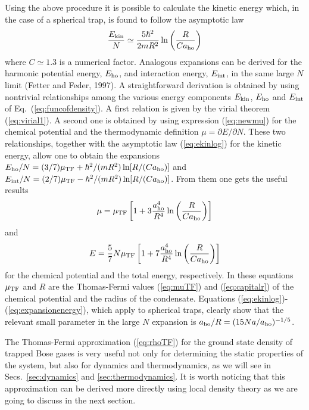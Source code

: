 Using the above procedure it is possible to calculate the kinetic energy  
which, in the case of a spherical trap, is found to follow the 
asymptotic law 
\begin{equation}
{ E_{\rm kin} \over N } \simeq { 5 \hbar^2 \over 2mR^2 } 
\ln \left( { R  \over C a_{\rm ho} } \right)
\label{eq:ekinlog}
\end{equation}
where $C\simeq 1.3$ is a numerical factor.
Analogous expansions can be derived for the harmonic potential energy,
$E_{\rm ho}$,  and interaction energy, $E_{\rm int}$, in the same large $N$
limit (Fetter and Feder, 1997). A straightforward derivation is obtained 
by using nontrivial relationships among the various energy components 
$E_{\rm kin}$, $E_{\rm ho}$ 
and $E_{\rm int}$ of Eq.~(\ref{eq:funcofdensity}).  A first relation is 
given by the virial theorem (\ref{eq:virial1}). A second one is obtained 
by using expression (\ref{eq:newmu}) for the chemical potential and the 
thermodynamic definition $\mu=\partial E/\partial N$. These two 
relationships, together with the asymptotic law (\ref{eq:ekinlog}) 
for the kinetic energy, allow one to obtain the expansions 
$E_{\rm ho}/N =(3/7)\mu_{\rm TF} +  \hbar^2/(mR^2) \ln [R/(C a_{\rm ho})]$
and $E_{\rm int}/N=(2/7)\mu_{\rm TF} - \hbar^2/(mR^2) \ln [R/(C a_{\rm ho})]$. 
From them one gets the useful results 
\begin{equation}
\mu =  \mu_{\rm TF} \left[ 1+ 3\frac{a_{\rm ho}^4}{R^4}
\ln \left(\frac{R}{Ca_{\rm ho}} \right) \right]
\label{eq:expansionmu}
\end{equation}
and
\begin{equation}
E =  {5 \over 7} N \mu_{\rm TF} \left[ 1+ 7\frac{a_{\rm ho}^4}{R^4}
\ln \left(\frac{R}{Ca_{\rm ho}}\right) \right]
\label{eq:expansionenergy}
\end{equation}
for the chemical potential and the total energy, respectively. In
these equations $\mu_{\rm TF}$ and $R$ are the Thomas-Fermi values
(\ref{eq:muTF}) and (\ref{eq:capitalr}) of the chemical potential and
the radius of the condensate. Equations 
(\ref{eq:ekinlog})-(\ref{eq:expansionenergy}), which apply to spherical 
traps, clearly show that the relevant small parameter in the 
large $N$ expansion is $a_{\rm ho}/R = (15 Na / a_{\rm ho})^{-1/5}$. 

The Thomas-Fermi approximation (\ref{eq:rhoTF}) for the ground
state density of trapped Bose gases is very useful not only for
determining the static properties of the system, but also for dynamics and
thermodynamics, as we will see in Secs.~\ref{sec:dynamics} and
\ref{sec:thermodynamics}. It is worth noticing that this approximation 
can be derived more directly using  local density theory
as we are going to discuss in the next section.


